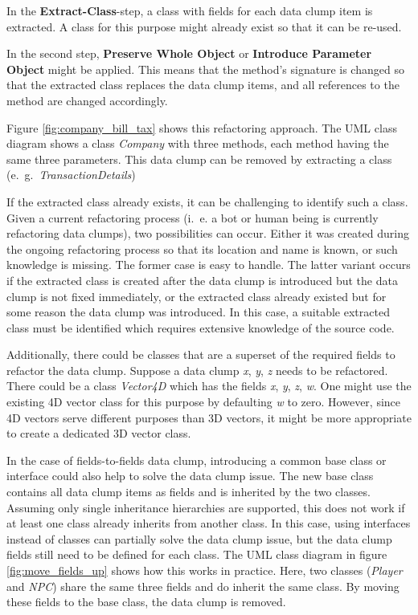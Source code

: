 In the  \textbf{Extract-Class}-step, a class with fields for each data clump item is extracted. A class for this purpose might already exist so that it can be re-used.

In the second step, \textbf{Preserve Whole Object} or \textbf{Introduce Parameter Object} might be applied. This means that the method's signature is changed so that the extracted class replaces the data clump items, and all references to the method are changed accordingly.

Figure \ref{fig:company_bill_tax} shows this refactoring approach. The \ac{UML} class diagram shows a class \textit{Company} with three methods, each method having the same three parameters. This data clump can be removed by extracting a class (e.~g.~\textit{TransactionDetails})

If the extracted class already exists, it can be challenging to identify such a class. Given a current refactoring process (i.~e. a bot or human being is currently refactoring data clumps), two possibilities can occur. Either it was created during the ongoing refactoring process so that its location and name is known, or such knowledge is missing. The former case is easy to handle.  The latter variant occurs if the extracted class is created after the data clump is introduced but the data clump is not fixed immediately, or the extracted class already existed but for some reason the data clump was introduced. In this case, a suitable extracted class must be identified which requires extensive knowledge of the source code.

Additionally, there could be classes that are a superset of the required fields to refactor the data clump. Suppose a data clump \textit{x}, \textit{y}, \textit{z} needs to be refactored. There could be a  class \textit{Vector4D} which has the fields  \textit{x}, \textit{y}, \textit{z}, \textit{w}. One might use the existing 4D vector class for this purpose by defaulting \textit{w} to zero. However, since 4D vectors serve different purposes than 3D vectors, it might be more appropriate to create a dedicated 3D vector class.


In the case of fields-to-fields data clump, introducing a common base class or interface could also help to solve the data clump issue. The new base class contains all data clump items as fields and is inherited by the two classes. Assuming only single inheritance hierarchies are supported, this does not work if at least one class already inherits from another class. In this case, using interfaces instead of classes can partially solve the data clump issue, but the data clump fields still need to be defined for each class. The \ac{UML} class diagram in figure \ref{fig:move_fields_up} shows how this works in practice. Here, two classes (\textit{Player} and \textit{NPC}) share the same three fields and do inherit the same class. By moving these fields to the base class, the data clump is removed. 

